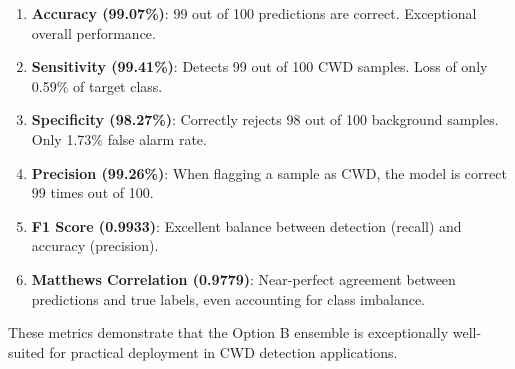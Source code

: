 \begin{enumerate}
    \item \textbf{Accuracy (99.07\%)}: 99 out of 100 predictions are correct. Exceptional overall performance.

    \item \textbf{Sensitivity (99.41\%)}: Detects 99 out of 100 CWD samples. Loss of only 0.59\% of
          target class.

    \item \textbf{Specificity (98.27\%)}: Correctly rejects 98 out of 100 background samples. Only
          1.73\% false alarm rate.

    \item \textbf{Precision (99.26\%)}: When flagging a sample as CWD, the model is correct 99 times out of 100.

    \item \textbf{F1 Score (0.9933)}: Excellent balance between detection (recall) and accuracy (precision).

    \item \textbf{Matthews Correlation (0.9779)}: Near-perfect agreement between predictions and
          true labels, even accounting for class imbalance.
\end{enumerate}

These metrics demonstrate that the Option B ensemble is exceptionally well-suited for practical
deployment in CWD detection applications.
